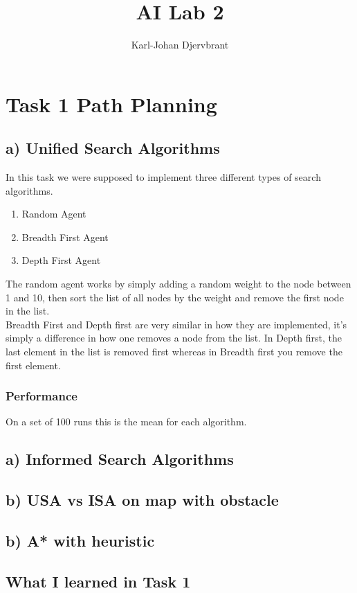 \documentclass{article}
\title{AI Lab 2}
\author{Karl-Johan Djervbrant}
\begin{document}
\maketitle

\section{Task 1 Path Planning}
\subsection{a) Unified Search Algorithms}
In this task we were supposed to implement three different types of search algorithms.
\begin{enumerate}
    \item Random Agent
    \item Breadth First Agent
    \item Depth First Agent 
\end{enumerate}
The random agent works by simply adding a random weight to the node between 1 and 10, then sort the list of all nodes by the weight and remove the first node in the list.\\
Breadth First and Depth first are very similar in how they are implemented, it's simply a difference in how one removes a node from the list. In Depth first, the last element in
the list is removed first whereas in Breadth first you remove the first element.
\subsubsection{Performance}
On a set of 100 runs this is the mean for each algorithm.


\subsection{a) Informed Search Algorithms}

\subsection{b) USA vs ISA on map with obstacle}

\subsection{b) A* with heuristic}

\subsection{What I learned in Task 1}
\end{document}
